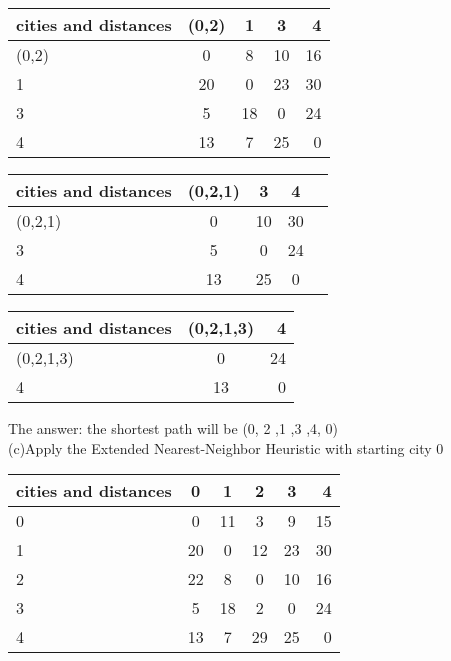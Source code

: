 \documentclass[12pt, letterpaper]{article}
\begin{document}
\begin{center} 
	
	\begin{tabular}{|l|| c|c| c| r|}
		\hline
		cities and distances & (0,2) & 1 & 3 & 4 \\
		\hline \hline
    	(0,2) & 0 & {\color{blue}8}  & 10  & 16\\
		\hline
		1 &20& 0 &23& 30\\
		\hline
		3 &5 &18 &0 &24\\
		\hline
		4 &13 &7 & 25& 0\\
		\hline
	\end{tabular}
\end{center}

\begin{center} 
	
	\begin{tabular}{|l|| c| c| c| r|}
		\hline
		cities and distances & (0,2,1) & 3 & 4 \\
		\hline \hline
		(0,2,1) & 0 & {\color{blue}10}   & 30\\
		\hline
		3 &5 &0 &24\\
		\hline
		4 &13& 25& 0\\
		\hline
	\end{tabular}
\end{center}

\begin{center} 
	
	\begin{tabular}{|l|| c| r|}
		\hline
		cities and distances & (0,2,1,3)  & 4 \\
		\hline \hline
		(0,2,1,3) & 0 & {\color{blue}24} \\
		\hline
		4 &13& 0\\
		\hline
	\end{tabular}
\end{center}
The answer:
the shortest path will be (0, 2 ,1 ,3 ,4, 0)\\

(c)Apply the Extended Nearest-Neighbor Heuristic with starting
city 0


\begin{center} 
	
	\begin{tabular}{|l|| c| c| c| c| r|}
		\hline
		cities and distances & 0 & 1 & 2 & 3 & 4 \\
		\hline \hline
		0 & 0 & 11 & {\color{blue}3}  & 9 & 15\\
		\hline
		1 & 20 & 0 & 12 & 23 &30\\
		\hline
		2 &22& 8 &0 &10& 16\\
		\hline
		3 &5 &18 &2 &0 &24\\
		\hline
		4 &13 &7 &29& 25& 0\\
		\hline
	\end{tabular}
\end{center}
\end{document}
